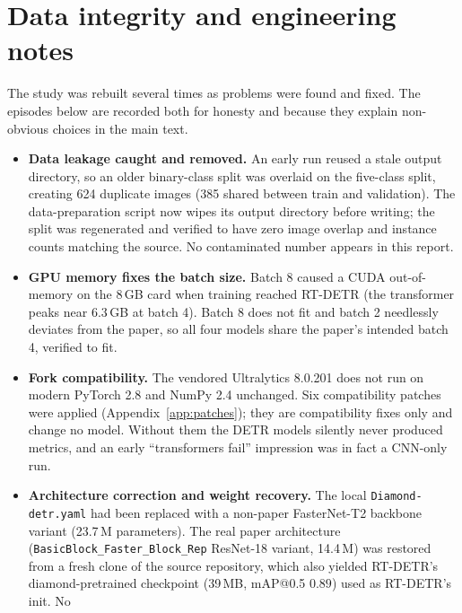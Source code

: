\documentclass[11pt,a4paper]{article}
\begin{document}
\appendix
\section{Data integrity and engineering notes}\label{app:integrity}
The study was rebuilt several times as problems were found and fixed. The episodes below are
recorded both for honesty and because they explain non-obvious choices in the main text.

\begin{itemize}[leftmargin=1.5em,itemsep=3pt,topsep=2pt]
  \item \textbf{Data leakage caught and removed.} An early run reused a stale output directory, so
        an older binary-class split was overlaid on the five-class split, creating 624 duplicate
        images (385 shared between train and validation). The data-preparation script now wipes its
        output directory before writing; the split was regenerated and verified to have zero image
        overlap and instance counts matching the source. No contaminated number appears in this
        report.
  \item \textbf{GPU memory fixes the batch size.} Batch 8 caused a CUDA out-of-memory on the 8\,GB
        card when training reached RT-DETR (the transformer peaks near $6.3$\,GB at batch 4). Batch 8
        does not fit and batch 2 needlessly deviates from the paper, so all four models share the
        paper's intended batch 4, verified to fit.
  \item \textbf{Fork compatibility.} The vendored Ultralytics 8.0.201 does not run on modern PyTorch
        2.8 and NumPy 2.4 unchanged. Six compatibility patches were applied (Appendix~\ref{app:patches});
        they are compatibility fixes only and change no model. Without them the DETR models silently
        never produced metrics, and an early ``transformers fail'' impression was in fact a CNN-only
        run.
  \item \textbf{Architecture correction and weight recovery.} The local \texttt{Diamond-detr.yaml}
        had been replaced with a non-paper FasterNet-T2 backbone variant (23.7\,M parameters). The
        real paper architecture (\texttt{BasicBlock\_Faster\_Block\_Rep} ResNet-18 variant, 14.4\,M)
        was restored from a fresh clone of the source repository, which also yielded RT-DETR's
        diamond-pretrained checkpoint (39\,MB, mAP@0.5 $0.89$) used as RT-DETR's init. No

\end{itemize}
\end{document}
